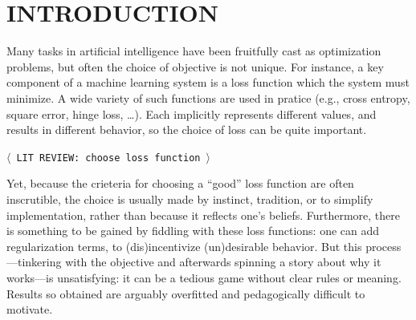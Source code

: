 \documentclass[twoside]{article}
\theoremstyle{plain}
\theoremstyle{definition}
\newcommand{\TODO}[1][INCOMPLETE]{{\centering\Large\color{red}$\langle$~\texttt{#1}~$\rangle$\par}}
\begin{document}
\section{INTRODUCTION}
Many tasks in artificial intelligence have been fruitfully cast as optimization problems, but often the choice of objective is not unique.
%
For instance, a key component of a machine learning system is a loss
function which the system must minimize.  A wide variety of such
functions are used in pratice (e.g., cross entropy, square error,
hinge loss, \ldots). 
Each implicitly represents different values, and results in different
behavior, so the choice of loss can be quite important.   
\TODO[LIT REVIEW: choose loss function]
Yet,
because the crieteria for choosing a ``good'' loss function are often
inscrutible, the choice is usually made by instinct, tradition, or to
simplify implementation, rather than because it reflects one's beliefs.
Furthermore, there is something to be gained by fiddling with these
loss functions: one can add regularization terms, to (dis)incentivize
(un)desirable behavior.
But this process---tinkering with the objective and afterwards
spinning a story about why it works---is unsatisfying: 
it can be a tedious game without clear rules or meaning. Results
so obtained are arguably overfitted and pedagogically difficult to
motivate. 
%
\end{document}
